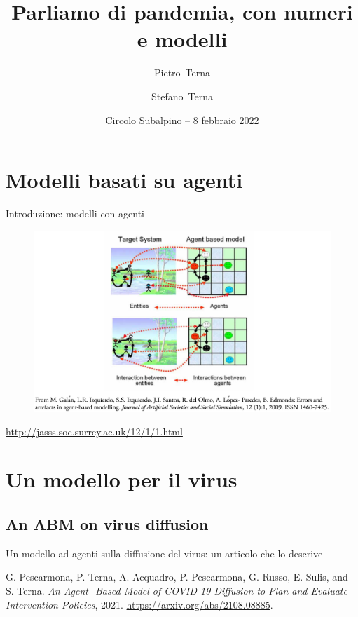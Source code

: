 \documentclass[]{beamer}
\title{Parliamo di pandemia, con numeri e modelli}
\author[] %
{Pietro~Terna\inst{1} \and Stefano~Terna\inst{2}  }
\institute[] %
{
  \inst{1}%
  Universita' di Torino (in pensione); F. Collegio Carlo Alberto, Torino, H. Fellow

  \inst{2}%
 PhD; tomorrowdata.io
  }
\date[] %
{Circolo Subalpino -- 8 febbraio 2022}
\begin{document}
\begin{frame}


\titlepage


\end{frame}

\section{Modelli basati su agenti}

\begin{frame}{Introduzione: modelli con agenti}



\begin{figure}[H]
\center
\includegraphics[scale=0.30]{abm.png}
\label{abmPicture}
\end{figure}
\href{http://jasss.soc.surrey.ac.uk/12/1/1.html}{http://jasss.soc.surrey.ac.uk/12/1/1.html}

\end{frame}


\section{Un modello per il virus}

\subsection{An ABM on virus diffusion}

\begin{frame}{Un modello ad agenti sulla diffusione del virus: un articolo che lo descrive}

G. Pescarmona, P. Terna, A. Acquadro, P. Pescarmona, G. Russo, E. Sulis, and S. Terna. \emph{An Agent- Based Model of COVID-19 Diffusion to Plan and Evaluate Intervention Policies}, 2021. \href{https://arxiv.org/abs/2108.08885}{https://arxiv.org/abs/2108.08885}.


\end{frame}
\end{document}

